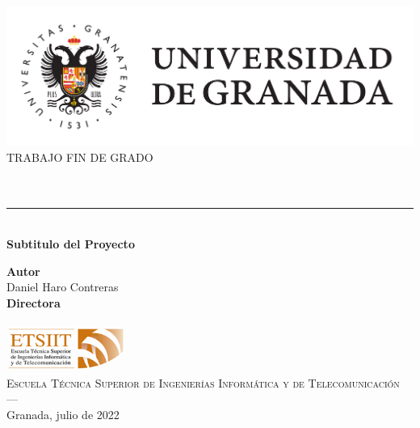 \begin{titlepage}
 
 
\newlength{\centeroffset}
\setlength{\centeroffset}{-0.5\oddsidemargin}
\addtolength{\centeroffset}{0.5\evensidemargin}
\thispagestyle{empty}

\noindent\hspace*{\centeroffset}\begin{minipage}{\textwidth}

\centering
\includegraphics[width=\textwidth]{imagenes/logo_ugr.pdf}\\[1.4cm]

\textsc{ \Large TRABAJO FIN DE GRADO\\[0.2cm]}
\textsc{ \myDegree }\\[1cm]
% 
{\Huge\bfseries \myTitle \\
}
\noindent\rule[-1ex]{\textwidth}{3pt}\\[3.5ex]
{\large\bfseries Subtitulo del Proyecto}
\end{minipage}

\vspace{2.5cm}
\noindent\hspace*{\centeroffset}\begin{minipage}{\textwidth}
\centering

\textbf{Autor}\\ {Daniel Haro Contreras}\\[2.5ex]
\textbf{Directora}\\
{\myProf}\\[1cm]
\includegraphics[width=0.3\textwidth]{imagenes/etsiit_logo.png}\\[0.1cm]
\textsc{Escuela Técnica Superior de Ingenierías Informática y de Telecomunicación}\\
\textsc{---}\\
Granada, julio de 2022
\end{minipage}
\end{titlepage}


